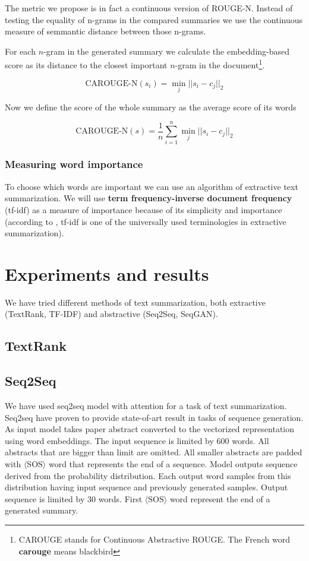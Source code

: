 \documentclass[sigplan]{acmart}
\begin{document}
The metric we propose is in fact a continuous version of ROUGE-N. Instead of testing the equality of n-grams in the compared summaries we use the continuous measure of semmantic distance between those n-grams.

For each $n$-gram in the generated summary we calculate the embedding-based score as its distance to the closest important $n$-gram in the document\footnote{CAROUGE stands for Continuous Abstractive ROUGE. The French word \textbf{carouge} means blackbird}.

\[ \text{CAROUGE-N}(s_i) = \operatorname*{min}_j ||s_i - c_j||_2 \]

Now we define the score of the whole summary as the average score of its words

\[ \text{CAROUGE-N}(s) = \frac1n \sum_{i=1}^n \operatorname*{min}_j ||s_i - c_j||_2 \]

\subsubsection{Measuring word importance}
\label{sec:importance}

To choose which words are important we can use an algorithm of extractive text summarization. We will use \textbf{term frequency-inverse document frequency} (tf-idf) as a measure of importance because of its simplicity and importance (according to \cite{kumar-16}, tf-idf is one of the universally used terminologies in extractive summarization).

\section{Experiments and results}

We have tried different methods of text summarization, both extractive (TextRank, TF-IDF) and abstractive (Seq2Seq, SeqGAN).

\subsection{TextRank}
\subsection{Seq2Seq}
We have used seq2seq model with attention for a task of text summarization. Seq2seq have proven to provide state-of-art result in tasks of sequence generation.
As input model takes paper abstract converted to the vectorized representation using word embeddings.  The input sequence is limited by 600 words. All abstracts that are bigger than limit are omitted. All smaller abstracts are padded with $\langle\text{SOS}\rangle$ word that represents the end of a sequence.
Model outputs sequence derived from the probability distribution. Each output word samples from this distribution having input sequence and previously generated samples. Output sequence is limited by 30 words. First $\langle\text{SOS}\rangle$ word represent the end of a generated summary.
\end{document}
